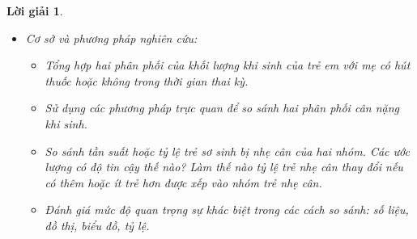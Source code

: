 \documentclass[14pt, a4paper]{article}
\theoremstyle{sltheorem}
\theoremstyle{soltheorem}
\newtheorem*{loigiai}{Lời giải}
\begin{document}
\begin{loigiai}
\begin{itemize}
        \begin{itemize}
            \item Những phụ nữ tham gia chương trình chăm sóc y tế tại Kaiser tương đối sớm trong thai kỳ.
            Hai phần ba trong báo cáo là vào 3 tháng đầu tiên, gần một phần hai khi đang mang thai 2 tháng hoặc ít hơn. 
            Các gia đình tham gia nghiên cứu nằm trong đa dạng các đặc điểm kinh tế, xã hội và giao dục. 
            Gần hai phần ba là người da trắng, một phần năm là người da màu, 3 đến 4 \% là người phương Đông, và còn lại các các chủng tộc khác và các hôn nhân hỗn hợp màu da. Khoảng 30 \% các ông chồng làm nghề chuyên nghiệp. 
            Một lượng lớn là các thành viên của các hiệp hội khác nhau. Gần 10 \% đang làm việc tại Đại học California Berkeley trong các vị trí học thuật hoặc hành chính, và 20 phần trăm là trong cơ quan chính phủ. 
            Trình độ học vấn cao hơn chút so với mặt bằng chung bang California cũng như thu nhập trung bình. 
            Vì vậy đối tương nghiên cứu nói chung không phải là điển hình của dân số có việc làm. Những người tham gia thiếu phân khúc rất nghèo hoặc rất giàu vì những những nhóm này không có khả năng đại diện trong một chương trình y tế trả trước.
            \item Khi sinh ra, các phép đo sẽ được thực hiện trên các em bé. 
            Bao gồm chiều dài, cân nặng và chu vi vòng đầu của em bé. 
            Được cung cấp ở đây là một tập con của thông tin thu thập từ 1236 em bé - những bé trai được sinh ra trong một năm của nghiên cứu đã sống ít nhất 28 ngày và là trẻ được sinh một (tức là không phải là một trong các cặp song sinh hoặc sinh ba). 
            Thông tin có cho mỗi em bé là cân nặng khi sinh và người mẹ có hút thuốc khi mang thai hay không.
        \end{itemize}
        \item Cơ sở và phương pháp nghiên cứu:
        \begin{itemize}
            \item Tổng hợp hai phân phối của khối lượng khi sinh của trẻ em với mẹ có hút thuốc hoặc không trong thời gian thai kỳ.
            \item Sử dụng các phương pháp trực quan để so sánh hai phân phối cân nặng khi sinh.
            \item So sánh tần suất hoặc tỷ lệ trẻ sơ sinh bị nhẹ cân của hai nhóm. Các ước lượng có độ tin cậy thế nào? Làm thế nào tỷ lệ trẻ nhẹ cân thay đổi nếu có thêm hoặc ít trẻ hơn được xếp vào nhóm trẻ nhẹ cân.
            \item Đánh giá mức độ quan trọng sự khác biệt trong các cách so sánh: số liệu, đồ thị, biểu đồ, tỷ lệ.
        \end{itemize}
    \end{itemize}
\end{loigiai}
\end{document}

